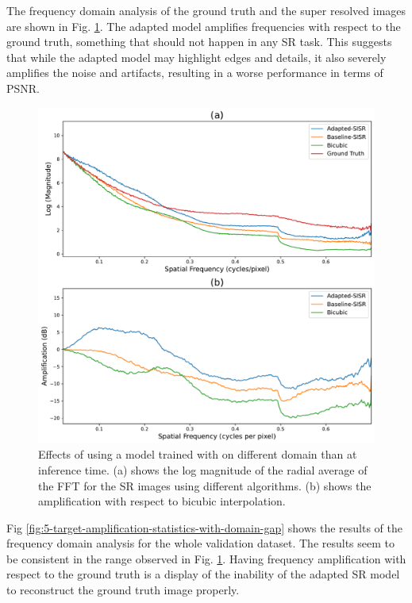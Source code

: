         The frequency domain analysis of the ground truth and the super resolved images are shown in Fig. \ref{fig:5-target-prediction-with-domain-gap-fft}.  
        The adapted model amplifies frequencies with respect to the ground truth, something that should not happen in any SR task. 
        This suggests that while the adapted model may highlight edges and details, it also severely amplifies the noise and artifacts, resulting in a worse performance in terms of PSNR.
        

        \begin{figure}[H]
            \centering
            \includegraphics[scale=0.4]{Includes/5-target-prediction-with-domain-gap-fft.pdf}
            \caption{Effects of using a model trained with on different domain than at inference time. 
                     (a) shows the log magnitude of the radial average of the FFT for the SR images using different algorithms.
                     (b) shows the amplification with respect to bicubic interpolation.
                     }
            \label{fig:5-target-prediction-with-domain-gap-fft}
        \end{figure}

        Fig \ref{fig:5-target-amplification-statistics-with-domain-gap} shows the results of the frequency domain analysis for the whole validation dataset. The results seem to be consistent in the range observed in Fig. \ref{fig:5-target-prediction-with-domain-gap-fft}. Having frequency amplification with respect to the ground truth is a display of the inability of the adapted SR model to reconstruct the ground truth image properly.
        
